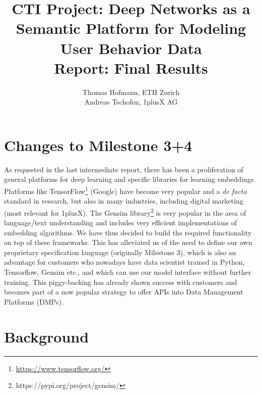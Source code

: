 \documentclass{article}
\author{Thomas Hofmann, ETH Zurich \\ Andreas Tschofen, 1plusX AG}
\title{CTI Project: Deep Networks as a Semantic Platform for Modeling User Behavior Data\\ [2mm] Report: Final Results}
\begin{document}
\maketitle

\section{Changes to Milestone 3+4} 

As requested in the last intermediate report, there has been a proliferation of general platforms for deep learning and specific libraries for learning embeddings. Platforms like TensorFlow\footnote{\url{https://www.tensorflow.org/}} (Google) have become very popular and a \textit{de facto} standard in research, but also in many industries, including digital marketing (most relevant for 1plusX). The Gensim library\footnote{https://pypi.org/project/gensim/} is very popular in the area of language/text understanding and includes very efficient implementations of embedding algorithms. We have thus decided to build the required functionality on top of these frameworks. This has alleviated us of the need to define our own proprietary specification language (originally Milestone 3), which is also an advantage for customers who nowadays have data scientist trained in Python, Tensorflow, Gensim etc., and which can use our model interface without further training. This piggy-backing has already shown success with customers and becomes part of a now popular strategy to offer APIs into Data Management Platforms (DMPs). 

\section{Background} 
\end{document}
